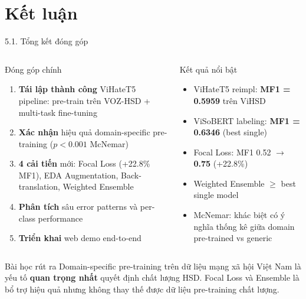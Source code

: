 \documentclass[11pt, aspectratio=169]{beamer}
\begin{document}
\section{Kết luận}

\begin{frame}[shrink=5]{5.1. Tổng kết đóng góp}

\begin{columns}[T]
  \begin{block}{Đóng góp chính}
    \begin{enumerate}
      \item \textbf{Tái lập thành công} ViHateT5 pipeline: pre-train trên VOZ-HSD + multi-task fine-tuning
      \item \textbf{Xác nhận} hiệu quả domain-specific pre-training ($p < 0.001$ McNemar)
      \item \textbf{4 cải tiến} mới: Focal Loss (+22.8\% MF1), EDA Augmentation, Back-translation, Weighted Ensemble
      \item \textbf{Phân tích} sâu error patterns và per-class performance
      \item \textbf{Triển khai} web demo end-to-end
    \end{enumerate}
  \end{block}

  \begin{block}{Kết quả nổi bật}
    \begin{itemize}
      \item ViHateT5 reimpl: \textbf{MF1 = 0.5959} trên ViHSD
      \item ViSoBERT labeling: \textbf{MF1 = 0.6346} (best single)
      \item Focal Loss: MF1 0.52 $\rightarrow$ \textbf{0.75} (+22.8\%)
      \item Weighted Ensemble $\geq$ best single model
      \item McNemar: khác biệt có ý nghĩa thống kê giữa domain pre-trained vs generic
    \end{itemize}
  \end{block}
\end{columns}

\vspace{0.2cm}
\begin{block}{Bài học rút ra}
  Domain-specific pre-training trên dữ liệu mạng xã hội Việt Nam là yếu tố \textbf{quan trọng nhất} quyết định chất lượng HSD. Focal Loss và Ensemble là bổ trợ hiệu quả nhưng không thay thế được dữ liệu pre-training chất lượng.
\end{block}
\end{frame}
\end{document}
